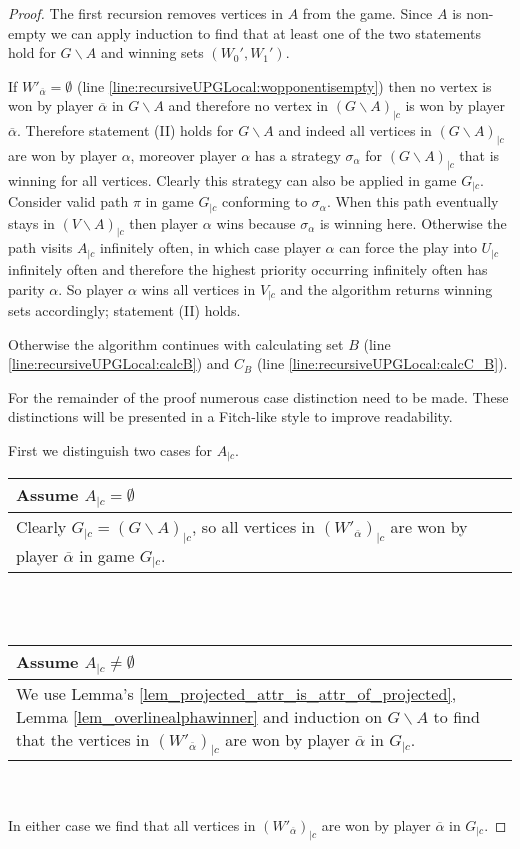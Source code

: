 \begin{theorem}
\begin{proof}
		The first recursion removes vertices in $A$ from the game. Since $A$ is non-empty we can apply induction to find that at least one of the two statements hold for $G\backslash A$ and winning sets $(W_0',W_1')$.
		
		If $W'_{\overline{\alpha}} = \emptyset$ (line \ref{line:recursiveUPGLocal:wopponentisempty}) then no vertex is won by player $\overline{\alpha}$ in $G\backslash A$ and therefore no vertex in $(G\backslash A)_{|c}$ is won by player $\overline{\alpha}$. Therefore statement (II) holds for $G\backslash A$ and indeed all vertices in $(G\backslash A)_{|c}$ are won by player $\alpha$, moreover player $\alpha$ has a strategy $\sigma_\alpha$ for $(G\backslash A)_{|c}$ that is winning for all vertices. Clearly this strategy can also be applied in game $G_{|c}$. Consider valid path $\pi$ in game $G_{|c}$ conforming to $\sigma_\alpha$. When this path eventually stays in $(V \backslash A)_{|c}$ then player $\alpha$ wins because $\sigma_\alpha$ is winning here. Otherwise the path visits $A_{|c}$ infinitely often, in which case player $\alpha$ can force the play into $U_{|c}$ infinitely often and therefore the highest priority occurring infinitely often has parity $\alpha$. So player $\alpha$ wins all vertices in $V_{|c}$ and the algorithm returns winning sets accordingly; statement (II) holds.
		
		Otherwise the algorithm continues with calculating set $B$ (line \ref{line:recursiveUPGLocal:calcB}) and $C_B$ (line \ref{line:recursiveUPGLocal:calcC_B}).
		
		For the remainder of the proof numerous case distinction need to be made. These distinctions will be presented in a Fitch-like style to improve readability.
		
		First we distinguish two cases for $A_{|c}$.
		
		\begin{tabular}{|p{14.2cm}}
			Assume $A_{|c} = \emptyset$\\
			\hline
			Clearly $G_{|c} = (G\backslash A)_{|c}$, so all vertices in $(W'_{\overline{\alpha}})_{|c}$ are won by player $\overline{\alpha}$ in game $G_{|c}$.
		\end{tabular}\\\\
		\begin{tabular}{|p{14.2cm}}
			Assume $A_{|c} \neq \emptyset$\\
			\hline
			We use Lemma's \ref{lem_projected_attr_is_attr_of_projected}, Lemma \ref{lem_overlinealphawinner} and induction on $G\backslash A$ to find that the vertices in $(W'_{\overline{\alpha}})_{|c}$ are won by player $\overline{\alpha}$ in $G_{|c}$.
		\end{tabular}\\\\
		In either case we find that all vertices in $(W'_{\overline{\alpha}})_{|c}$ are won by player $\overline{\alpha}$ in $G_{|c}$.
		

\end{proof}
\end{theorem}
